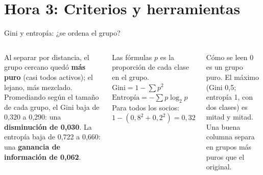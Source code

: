 \documentclass[aspectratio=169,11pt]{beamer}
\begin{document}
\section{Hora 3: Criterios y herramientas}
\begin{frame}[t]{Gini y entropía: ¿se ordena el grupo?}
  \begin{columns}[T,onlytextwidth]
    \centering

    \vspace{0.15cm}
    \raggedright\footnotesize
    Al separar por distancia, el grupo cercano quedó \textbf{más puro} (casi todos activos); el
    lejano, más mezclado. Promediando según el tamaño de cada grupo, el Gini
    baja de 0,320 a 0,290: una \textbf{disminución de 0,030}. La entropía
    baja de 0,722 a 0,660: una \textbf{ganancia de información de 0,062}.
    \begin{block}{Las fórmulas}
      \footnotesize $p$ es la proporción de cada clase en el grupo.\\[3pt]
      $\text{Gini} = 1 - \sum p^2$\\[2pt]
      $\text{Entropía} = -\sum p \log_2 p$\\[4pt]
      Para todos los socios:\\
      $1 - (0{,}8^2 + 0{,}2^2) = 0{,}32$
    \end{block}
    \begin{exampleblock}{Cómo se leen}
      \footnotesize 0 es un grupo puro. El máximo (Gini 0,5; entropía 1,
      con dos clases) es mitad y mitad. Una buena columna separa en
      grupos más puros que el original.
    \end{exampleblock}
  \end{columns}
\end{frame}
\end{document}
